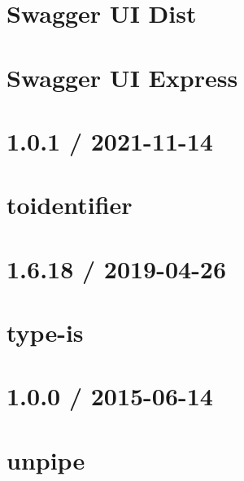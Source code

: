 \documentclass[twoside]{book}
\newcommand{\+}{\discretionary{\mbox{\scriptsize$\hookleftarrow$}}{}{}}
\begin{document}
\chapter{Swagger UI Dist}
\label{md_src_nodejs_node_modules_swagger_ui_dist_README}

\chapter{Swagger UI Express}
\label{md_src_nodejs_node_modules_swagger_ui_express_README}

\chapter{1.0.1 / 2021-\/11-\/14}
\label{md_src_nodejs_node_modules_toidentifier_HISTORY}

\chapter{toidentifier}
\label{md_src_nodejs_node_modules_toidentifier_README}

\chapter{1.6.18 / 2019-\/04-\/26}
\label{md_src_nodejs_node_modules_type_is_HISTORY}

\chapter{type-\/is}
\label{md_src_nodejs_node_modules_type_is_README}

\chapter{1.0.0 / 2015-\/06-\/14}
\label{md_src_nodejs_node_modules_unpipe_HISTORY}

\chapter{unpipe}
\label{md_src_nodejs_node_modules_unpipe_README}

\end{document}
